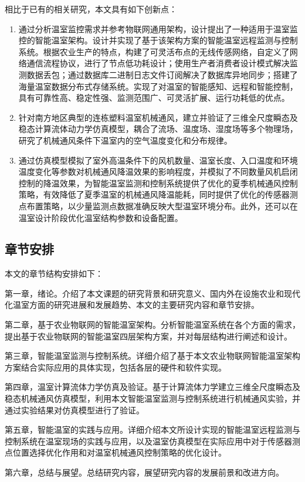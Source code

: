 	相比于已有的相关研究，本文具有如下创新点：
		\begin{enumerate}
			\item 通过分析温室监控需求并参考物联网通用架构，设计提出了一种适用于温室监控的智能温室架构。设计并实现了基于该架构方案的智能温室远程监测与控制系统。根据农业生产的特点，构建了可灵活布点的无线传感网络，自定义了网络通信流程协议，进行了节点低功耗设计；使用生产者消费者设计模式解决监测数据丢包；通过数据库二进制日志文件订阅解决了数据库异地同步；搭建了海量温室数据分布式存储系统。实现了对温室的智能感知、远程和智能控制，具有可靠性高、稳定性强、监测范围广、可灵活扩展、运行功耗低的优点。
			\item 针对南方地区典型的连栋塑料温室机械通风，建立并验证了三维全尺度瞬态及稳态计算流体动力学仿真模型，耦合了流场、温度场、湿度场等多个物理场，研究了机械通风条件下温室内的空气温度变化和分布规律。
			\item 通过仿真模型模拟了室外高温条件下的风机数量、温室长度、入口温度和环境温度变化等参数对机械通风降温效果的影响程度，并模拟了不同数量风机启闭控制的降温效果，为智能温室监测和控制系统提供了优化的夏季机械通风控制策略，有效降低了夏季温室的机械通风降温能耗，同时提供了优化的传感器测点布置策略，以少量监测点数据准确反映大型温室环境分布。此外，还可以在温室设计阶段优化温室结构参数和设备配置。
		\end{enumerate}	
	\subsection{章节安排}
	本文的章节结构安排如下：
	
第一章，绪论。介绍了本文课题的研究背景和研究意义、国内外在设施农业和现代化温室方面的研究进展和发展趋势、本文的主要研究内容和章节安排。

第二章，基于农业物联网的智能温室架构。分析智能温室系统在各个方面的需求，提出基于农业物联网的智能温室四层架构方案，并对每层结构进行阐述和设计。

第三章，智能温室监测与控制系统。详细介绍了基于本文农业物联网智能温室架构方案结合实际应用的具体实现，包括各层的硬件和软件实现。

第四章，温室计算流体力学仿真及验证。基于计算流体力学建立三维全尺度瞬态及稳态机械通风仿真模型，利用本文智能温室监测与控制系统进行机械通风实验，并通过实验结果对仿真模型进行了验证。

第五章，智能温室的实践与应用。详细介绍本文所设计实现的智能温室远程监测与控制系统在温室现场的实践与应用，以及温室仿真模型在实际应用中对于传感器测点位置选择优化作用和对温室机械通风控制策略的优化设计。

第六章，总结与展望。总结研究内容，展望研究内容的发展前景和改进方向。